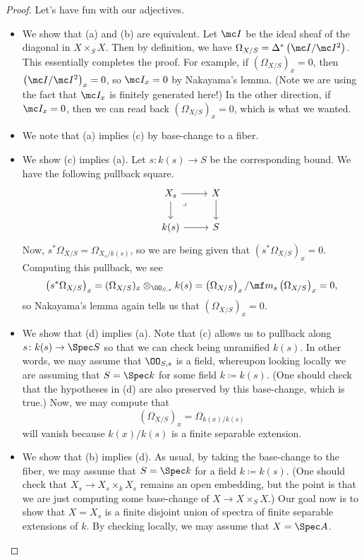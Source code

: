 \documentclass[../notes.tex]{subfiles}
\begin{document}
\begin{proof}
	Let's have fun with our adjectives.
	\begin{itemize}
		\item We show that (a) and (b) are equivalent. Let $\mc I$ be the ideal sheaf of the diagonal in $X\times_SX$. Then by definition, we have $\Omega_{X/S}=\Delta^*\left(\mc I/\mc I^2\right)$. This essentially completes the proof. For example, if $(\Omega_{X/S})_x=0$, then $\left(\mc I/\mc I^2\right)_x=0$, so $\mc I_x=0$ by Nakayama's lemma. (Note we are using the fact that $\mc I_x$ is finitely generated here!) In the other direction, if $\mc I_x=0$, then we can read back $(\Omega_{X/S})_x=0$, which is what we wanted.
		\item We note that (a) implies (c) by base-change to a fiber.
		\item We show (c) implies (a). Let $s\colon k(s)\to S$ be the corresponding bound. We have the following pullback square.
		\[\begin{tikzcd}
			{X_s} & X \\
			{k(s)} & S
			\arrow[from=1-1, to=1-2]
			\arrow[from=2-1, to=2-2]
			\arrow[from=1-2, to=2-2]
			\arrow[from=1-1, to=2-1]
			\arrow["\lrcorner"{anchor=center, pos=0.125}, draw=none, from=1-1, to=2-2]
		\end{tikzcd}\]
		Now, $s^*\Omega_{X/S}=\Omega_{X_s/k(s)}$, so we are being given that $\left(s^*\Omega_{X/S}\right)_x=0$. Computing this pullback, we see
		\[\left(s^*\Omega_{X/S}\right)_x=(\Omega_{X/S})_x\otimes_{\OO_{S,s}}k(s)=\left(\Omega_{X/S}\right)_x/\mf m_s\left(\Omega_{X/S}\right)_x=0,\]
		so Nakayama's lemma again tells us that $\left(\Omega_{X/S}\right)_x=0$.
		\item We show that (d) implies (a). Note that (c) allows us to pullback along $s\colon k(s)\to\Spec S$ so that we can check being unramified $k(s)$. In other words, we may assume that $\OO_{S,s}$ is a field, whereupon looking locally we are assuming that $S=\Spec k$ for some field $k\coloneqq k(s)$. (One should check that the hypotheses in (d) are also preserved by this base-change, which is true.) Now, we may compute that
		\[\left(\Omega_{X/S}\right)_x=\Omega_{k(x)/k(s)}\]
		will vanish because $k(x)/k(s)$ is a finite separable extension.
		\item We show that (b) implies (d). As usual, by taking the base-change to the fiber, we may assume that $S=\Spec k$ for a field $k\coloneqq k(s)$. (One should check that $X_s\to X_s\times_kX_s$ remains an open embedding, but the point is that we are just computing some base-change of $X\to X\times_SX$.) Our goal now is to show that $X=X_s$ is a finite disjoint union of spectra of finite separable extensions of $k$. By checking locally, we may assume that $X=\Spec A$.


\end{itemize}
\end{proof}
\end{document}
